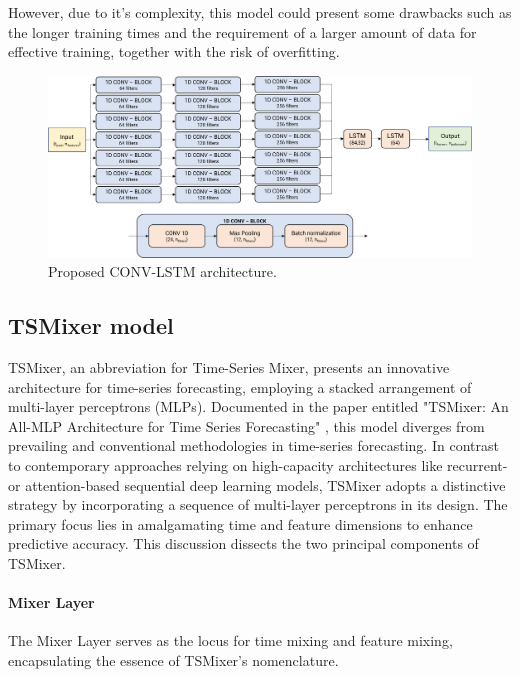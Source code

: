 However, due to it's complexity, this model could present some drawbacks such as the longer training times and the requirement of a larger amount of data for effective training, together with the risk of overfitting.


\begin{figure}
    \centering
    \includegraphics[width=1\linewidth]{images/model architectures/convlstm_model.png}
    \caption{Proposed CONV-LSTM architecture.}
    \label{fig:convlstm_model}
\end{figure}

\subsection*{TSMixer model}

TSMixer, an abbreviation for Time-Series Mixer, presents an innovative architecture for time-series forecasting, employing a stacked arrangement of multi-layer perceptrons (MLPs). Documented in the paper entitled "TSMixer: An All-MLP Architecture for Time Series Forecasting" \cite{chen2023tsmixer}, this model diverges from prevailing and conventional methodologies in time-series forecasting. In contrast to contemporary approaches relying on high-capacity architectures like recurrent- or attention-based sequential deep learning models, TSMixer adopts a distinctive strategy by incorporating a sequence of multi-layer perceptrons in its design. The primary focus lies in amalgamating time and feature dimensions to enhance predictive accuracy. This discussion dissects the two principal components of TSMixer.

\paragraph{Mixer Layer}

The Mixer Layer serves as the locus for time mixing and feature mixing, encapsulating the essence of TSMixer's nomenclature.

